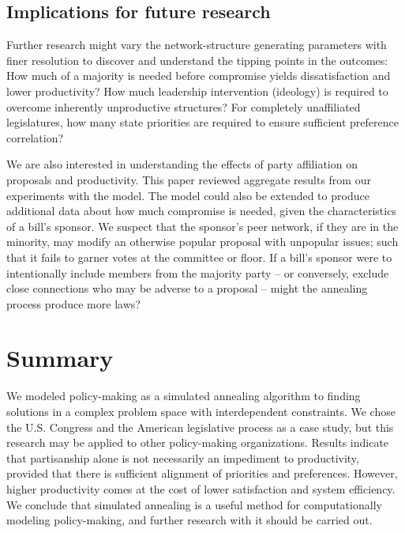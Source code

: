 \documentclass[pdftex,12pt,oribibl]{llncs}
\begin{document}
\subsection{Implications for future research}
Further research might vary the network-structure generating parameters with finer resolution to discover and understand the tipping points in the outcomes:
How much of a majority is needed before compromise yields dissatisfaction and lower productivity? 
How much leadership intervention (ideology) is required to overcome inherently unproductive structures?  
For completely unaffiliated legislatures, how many state priorities are required to ensure sufficient preference correlation?

We are also interested in understanding the effects of party affiliation on proposals and productivity. This paper reviewed aggregate results from our experiments with the model.
The model could also be extended to produce additional data about how much compromise is needed, given the characteristics of a bill's sponsor.
We suspect that the sponsor's peer network, if they are in the minority, may modify an otherwise popular proposal with unpopular issues; such that it fails to garner votes at the committee or floor. 
If a bill's sponsor were to intentionally include members from the majority party -- or conversely, exclude close connections who may be adverse to a proposal -- might the annealing process produce more laws?

\section{Summary}
We modeled policy-making as a simulated annealing algorithm to finding solutions in a complex problem space with interdependent constraints.
We chose the U.S. Congress and the American legislative process as a case study, but this research may be applied to other policy-making organizations.
Results indicate that partisanship alone is not necessarily an impediment to productivity, provided that there is sufficient alignment of priorities and preferences.
However, higher productivity comes at the cost of lower satisfaction and system efficiency.
We conclude that simulated annealing is a useful method for computationally modeling policy-making, and further research with it should be carried out.
 
\end{document}
